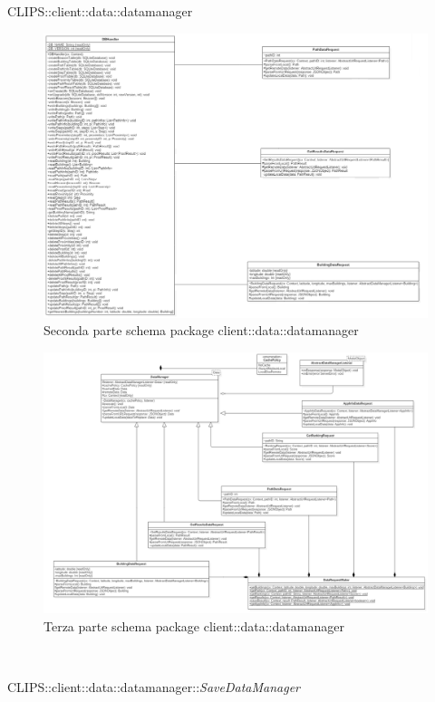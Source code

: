 \begin{componente}{CLIPS::client::data::datamanager}
\begin{figure}[h!]
	\includegraphics[scale=0.4]{img/package/png/client--datamanager2.png}
	\caption{Seconda parte schema package client::data::datamanager}
\end{figure}
\begin{figure}[h!]
	\centering
	\includegraphics[scale=0.35]{img/package/png/client--datamanager3.png}
	\caption{Terza parte schema package client::data::datamanager}
\end{figure}
\begin{compClassi} \\
\begin{classe}{CLIPS::client::data::datamanager::\textit{SaveDataManager}}

\end{classe}
\end{compClassi}
\end{componente}
